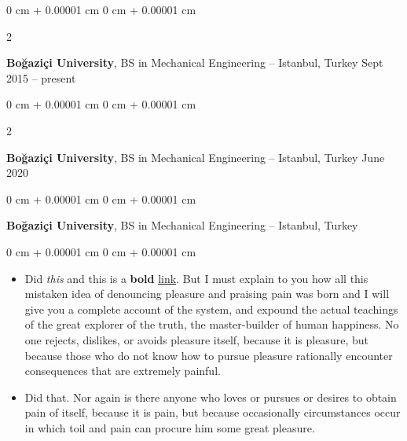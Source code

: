 \documentclass[10pt, letterpaper]{article}
\newenvironment{highlights}{
    \begin{itemize}[
        topsep=0.10 cm,
        parsep=0.10 cm,
        partopsep=0pt,
        itemsep=0pt,
        leftmargin=0 cm + 10pt
    ]
}{
    \end{itemize}
} %
\newenvironment{onecolentry}{
    \begin{adjustwidth}{
        0 cm + 0.00001 cm
    }{
        0 cm + 0.00001 cm
    }
}{
    \end{adjustwidth}
} %
\newenvironment{twocolentry}[2][]{
    \onecolentry
    \def\secondColumn{#2}
    \setcolumnwidth{\fill, 4.5 cm}
    \begin{paracol}{2}
}{
    \switchcolumn \raggedleft \secondColumn
    \end{paracol}
    \endonecolentry
} %
\begin{document}
        \vspace{0.2 cm}

        \begin{twocolentry}{
            Sept 2015 – present
        }
            \textbf{Boğaziçi University}, BS in Mechanical Engineering -- Istanbul, Turkey\end{twocolentry}



        \vspace{0.2 cm}

        \begin{twocolentry}{
            June 2020
        }
            \textbf{Boğaziçi University}, BS in Mechanical Engineering -- Istanbul, Turkey\end{twocolentry}



        \vspace{0.2 cm}

        \begin{onecolentry}
            \textbf{Boğaziçi University}, BS in Mechanical Engineering -- Istanbul, Turkey\end{onecolentry}

        \vspace{0.10 cm}
        \begin{onecolentry}
            \begin{highlights}
                \item Did \textit{this} and this is a \textbf{bold} \href{https://example.com}{link}. But I must explain to you how all this mistaken idea of denouncing pleasure and praising pain was born and I will give you a complete account of the system, and expound the actual teachings of the great explorer of the truth, the master-builder of human happiness. No one rejects, dislikes, or avoids pleasure itself, because it is pleasure, but because those who do not know how to pursue pleasure rationally encounter consequences that are extremely painful.
                \item Did that. Nor again is there anyone who loves or pursues or desires to obtain pain of itself, because it is pain, but because occasionally circumstances occur in which toil and pain can procure him some great pleasure.
            \end{highlights}
        \end{onecolentry}


        \vspace{0.2 cm}
\end{document}
